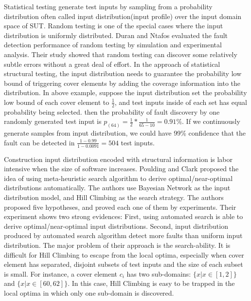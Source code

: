 \documentclass[journal]{IEEEtran}
\begin{document}
Statistical testing generate test inputs by sampling from a probability distribution often called input distribution(input profile) over the input domain space of SUT. Random testing is one of the special cases where the input distribution is uniformly distributed. Duran and Ntafos \cite{evaRandomTesting} evaluated the fault detection performance of random testing by simulation and experimental analysis. Their study showed that random testing can discover some relatively subtle errors without a great deal of effort. In the approach of statistical structural testing, the input distribution needs to guarantee the probability low bound of triggering cover elements by adding the coverage information into the distribution. In above example, suppose the input distribution set the probability low bound of each cover element to \(\frac{1}{2}\), and test inputs inside of each set has equal probability being selected. then the probability of fault discovery by one randomly generated test input is \(p_{(64)} = \frac{1}{2}*\frac{1}{65-10} = 0.91\%\). If we continuously generate samples from input distribution, we could have 99\% confidence that the fault can be detected in \(\frac{1-0.99}{1-0.0091} = 504\) test inputs. 

Construction input distribution encoded with structural information is labor intensive when the size of software increases. Poulding and Clark \cite{searchST} proposed the idea of using meta-heuristic search algorithm to derive optimal/near-optimal distributions automatically. The authors use Bayesian Network as the input distribution model, and Hill Climbing as the search strategy. The authors proposed five hypotheses, and proved each one of them by experiments. Their experiment shows two strong evidences: First, using automated search is able to derive optimal/near-optimal input distributions. Second, input distribution produced by automated search algorithm detect more faults than uniform input distribution. The major problem of their approach is the search-ability. It is difficult for Hill Climbing to escape from the local optima, especially when cover element has separated, disjoint subsets of test inputs and the size of each subset is small. For instance, a cover element \(c_{i}\) has two sub-domains: \(\{x|x \in [1,2]\}\) and  \(\{x|x \in [60,62]\}\). In this case, Hill Climbing is easy to be trapped in the local optima in which only one sub-domain is discovered.
\end{document}
